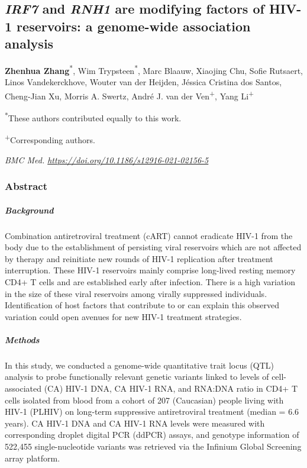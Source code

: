 \documentclass{book}
\begin{document}
\renewcommand{\thetable}{\textbf{Table \arabic{chapter}.\arabic{table}}}
\renewcommand{\thefigure}{\textbf{Figure \arabic{chapter}.\arabic{figure}}}

\begin{refsection} %

\chapter{\textit{IRF7} and \textit{RNH1} are modifying factors of HIV-1 reservoirs: a genome-wide association analysis}
\textbf{Zhenhua Zhang}\textsuperscript{*}, Wim Trypsteen\textsuperscript{*}, Marc Blaauw, Xiaojing Chu, Sofie Rutsaert, Linos Vandekerckhove, Wouter van der Heijden, Jéssica Cristina dos Santos, Cheng-Jian Xu, Morris A. Swertz, André J. van der Ven\textsuperscript{+}, Yang Li\textsuperscript{+}


\vfill
\begin{flushright}
  \textsuperscript{*}These authors contributed equally to this work. \par
  \textsuperscript{+}Corresponding authors. \par
  \textit{BMC Med. \url{https://doi.org/10.1186/s12916-021-02156-5}}
\end{flushright}


\newpage
\subsection*{Abstract}
\paragraph*{Background}
Combination antiretroviral treatment (cART) cannot eradicate HIV-1 from the body due to the establishment of persisting viral reservoirs which are not affected by therapy and reinitiate new rounds of HIV-1 replication after treatment interruption.
These HIV-1 reservoirs mainly comprise long-lived resting memory CD4+ T cells and are established early after infection.
There is a high variation in the size of these viral reservoirs among virally suppressed individuals.
Identification of host factors that contribute to or can explain this observed variation could open avenues for new HIV-1 treatment strategies.

\paragraph*{Methods}
In this study, we conducted a genome-wide quantitative trait locus (QTL) analysis to probe functionally relevant genetic variants linked to levels of cell-associated (CA) HIV-1 DNA, CA HIV-1 RNA, and RNA:DNA ratio in CD4+ T cells isolated from blood from a cohort of 207 (Caucasian) people living with HIV-1 (PLHIV) on long-term suppressive antiretroviral treatment (median = 6.6 years).
CA HIV-1 DNA and CA HIV-1 RNA levels were measured with corresponding droplet digital PCR (ddPCR) assays, and genotype information of 522,455 single-nucleotide variants was retrieved via the Infinium Global Screening array platform.


\end{refsection}
\end{document}
